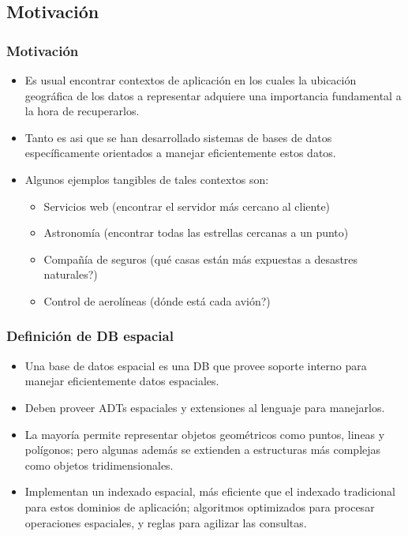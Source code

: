 
\subsection{Motivación}

\begin{frame}
\frametitle{Motivación}
\begin{itemize}
	\item	Es usual encontrar contextos de aplicación en los
		cuales la ubicación geográfica de los datos a representar
		adquiere una importancia fundamental a la hora de
		recuperarlos. \pause \\

	\item	Tanto es asi que se han desarrollado sistemas de
		bases de datos específicamente orientados a manejar
		eficientemente estos datos. \pause \\

	\item	Algunos ejemplos tangibles de tales contextos son: \pause
	\begin{itemize}
		\item	Servicios web (encontrar el servidor más cercano al cliente) \pause
		\item	Astronomía (encontrar todas las estrellas cercanas a un punto) \pause
		\item	Compañía de seguros (qué casas están más expuestas a desastres naturales?) \pause
		\item	Control de aerolíneas (dónde está cada avión?)
	\end{itemize}
\end{itemize}
\end{frame}

\begin{frame}
\frametitle{Definición de DB espacial}
\begin{itemize}
	\item	Una base de datos espacial es una DB que provee
		soporte interno para manejar eficientemente datos espaciales. \pause

	\item	Deben proveer ADTs espaciales y extensiones al lenguaje para manejarlos. \pause

	\item	La mayoría permite representar objetos geométricos como puntos,
		lineas y polígonos; pero algunas además se extienden a estructuras
		más complejas como objetos tridimensionales. \pause

	\item	Implementan un indexado espacial, más eficiente que el indexado
		tradicional para estos dominios de aplicación; algoritmos optimizados
		para procesar operaciones espaciales, y reglas para agilizar las consultas.
\end{itemize}
\end{frame}

